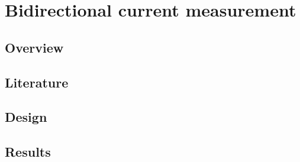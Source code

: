 \chapter{Bidirectional current measurement}\label{ch:bidircurrent}
\section{Overview}

\section{Literature}

\section{Design}
\newpage
\section{Results}

\vfill


